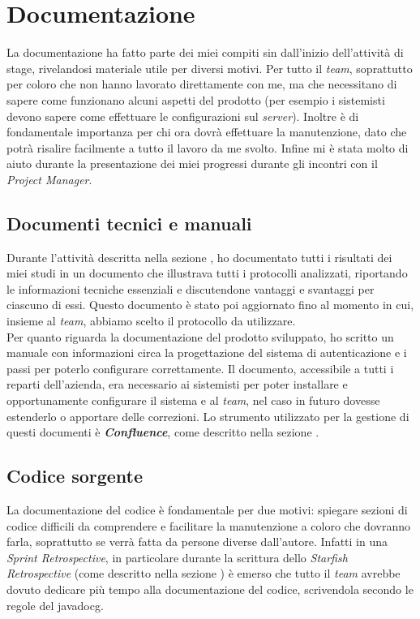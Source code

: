 \section{Documentazione}
La documentazione ha fatto parte dei miei compiti sin dall'inizio dell'attività di stage, rivelandosi materiale utile per diversi motivi. Per tutto il \textit{team}, soprattutto per coloro che non hanno lavorato direttamente con me, ma che necessitano di sapere come funzionano alcuni aspetti del prodotto (per esempio i sistemisti devono sapere come effettuare le configurazioni sul \textit{server}). Inoltre è di fondamentale importanza per chi ora dovrà effettuare la manutenzione, dato che potrà risalire facilmente a tutto il lavoro da me svolto. Infine mi è stata molto di aiuto durante la presentazione dei miei progressi durante gli incontri con il \textit{Project Manager}.

\subsection{Documenti tecnici e manuali}
Durante l'attività descritta nella sezione , ho documentato tutti i risultati dei miei studi in un documento che illustrava tutti i protocolli analizzati, riportando le informazioni tecniche essenziali e discutendone vantaggi e svantaggi per ciascuno di essi. Questo documento è stato poi aggiornato fino al momento in cui, insieme al \textit{team}, abbiamo scelto il protocollo da utilizzare. \\
Per quanto riguarda la documentazione del prodotto sviluppato, ho scritto un manuale con informazioni circa la progettazione del sistema di autenticazione e i passi per poterlo configurare correttamente. Il documento, accessibile a tutti i reparti dell'azienda, era necessario ai sistemisti per poter installare e opportunamente configurare il sistema e al \textit{team}, nel caso in futuro dovesse estenderlo o apportare delle correzioni.
Lo strumento utilizzato per la gestione di questi documenti è \textbf{\textit{Confluence}}, come descritto nella sezione .

\subsection{Codice sorgente}
La documentazione del codice è fondamentale per due motivi: spiegare sezioni di codice difficili da comprendere e facilitare la manutenzione a coloro che dovranno farla, soprattutto se verrà fatta da persone diverse dall'autore. Infatti in una \textit{Sprint Retrospective}, in particolare durante la scrittura dello \textit{Starfish Retrospective} (come descritto nella sezione ) è emerso che tutto il \textit{team} avrebbe dovuto dedicare più tempo alla documentazione del codice, scrivendola secondo le regole del \gls{javadocg}.


